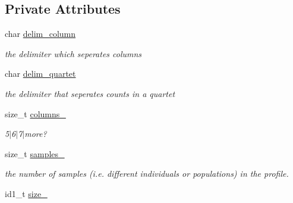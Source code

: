 \subsection*{Private Attributes}
\begin{DoxyCompactItemize}
\item 
\hypertarget{classprofile_a6aba87dd42332fe70f3dcf860c2ed416}{char \hyperlink{classprofile_a6aba87dd42332fe70f3dcf860c2ed416}{delim\-\_\-column}}\label{classprofile_a6aba87dd42332fe70f3dcf860c2ed416}

\begin{DoxyCompactList}\small\item\em the delimiter which seperates columns \end{DoxyCompactList}\item 
\hypertarget{classprofile_a9240e3dae6cdbe7c0f95fd1c47cec26e}{char \hyperlink{classprofile_a9240e3dae6cdbe7c0f95fd1c47cec26e}{delim\-\_\-quartet}}\label{classprofile_a9240e3dae6cdbe7c0f95fd1c47cec26e}

\begin{DoxyCompactList}\small\item\em the delimiter that seperates counts in a quartet \end{DoxyCompactList}\item 
\hypertarget{classprofile_a10753bd922a2b0ebf0820bdf47d6681f}{size\-\_\-t \hyperlink{classprofile_a10753bd922a2b0ebf0820bdf47d6681f}{columns\-\_\-}}\label{classprofile_a10753bd922a2b0ebf0820bdf47d6681f}

\begin{DoxyCompactList}\small\item\em 5$\vert$6$\vert$7$\vert$more? \end{DoxyCompactList}\item 
\hypertarget{classprofile_ae98e414de8dc2128723e1c68a182fb8f}{size\-\_\-t \hyperlink{classprofile_ae98e414de8dc2128723e1c68a182fb8f}{samples\-\_\-}}\label{classprofile_ae98e414de8dc2128723e1c68a182fb8f}

\begin{DoxyCompactList}\small\item\em the number of samples (i.\-e. different individuals or populations) in the profile. \end{DoxyCompactList}\item 
\hypertarget{classprofile_a9270632eed06e2397a824e6ddbf033b8}{id1\-\_\-t \hyperlink{classprofile_a9270632eed06e2397a824e6ddbf033b8}{size\-\_\-}}\label{classprofile_a9270632eed06e2397a824e6ddbf033b8}


\end{DoxyCompactItemize}
